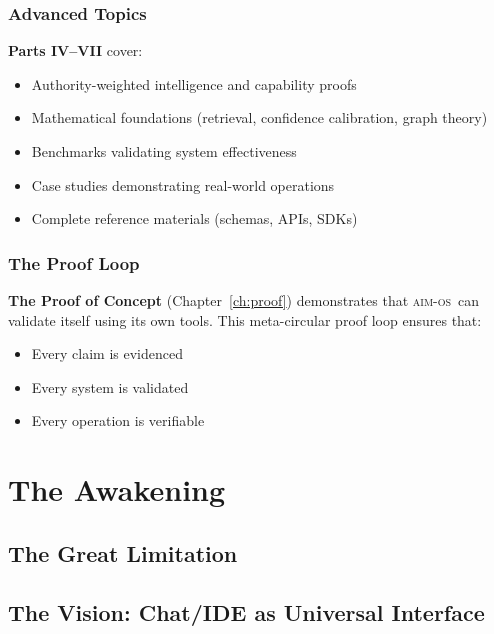 \documentclass[11pt,a4paper,twoside]{book}
\newcommand{\aimos}{\textsc{aim-os}}
\theoremstyle{definition}
\theoremstyle{remark}
\begin{document}
\section*{Advanced Topics}

\textbf{Parts IV--VII} cover:
\begin{itemize}
    \item Authority-weighted intelligence and capability proofs
    \item Mathematical foundations (retrieval, confidence calibration, graph theory)
    \item Benchmarks validating system effectiveness
    \item Case studies demonstrating real-world operations
    \item Complete reference materials (schemas, APIs, SDKs)
\end{itemize}

\section*{The Proof Loop}

\textbf{The Proof of Concept} (Chapter~\ref{ch:proof}) demonstrates that \aimos\ can validate itself using its own tools. This meta-circular proof loop ensures that:
\begin{itemize}
    \item Every claim is evidenced
    \item Every system is validated
    \item Every operation is verifiable
\end{itemize}

\mainmatter


\part{The Awakening}

\chapter{The Great Limitation}
\label{ch:great_limitation}


\chapter{The Vision: Chat/IDE as Universal Interface}
\label{ch:vision}

\end{document}

